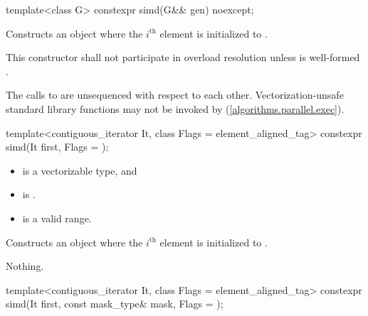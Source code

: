 \begin{itemdecl}
template<class G> constexpr simd(G&& gen) noexcept;
\end{itemdecl}

\begin{itemdescr}
  \pnum\effects
  Constructs an object where the $i^\text{th}$ element is initialized to .

  \pnum\remarks
  This constructor shall not participate in overload resolution unless  is well-formed \foralli.

  \pnum
  The calls to  are unsequenced with respect to each other. Vectorization-unsafe standard library functions may not be invoked by  (\ref{algorithms.parallel.exec}).
\end{itemdescr}

\begin{itemdecl}
template<contiguous_iterator It, class Flags = element_aligned_tag>
  constexpr simd(It first, Flags = {});
\end{itemdecl}

\begin{itemdescr}
  \pnum\constraints
  \begin{itemize}
    \item {} is a vectorizable type, and
    \item {} is .
  \end{itemize}

  \pnum\expects
  \begin{itemize}
    \item \tcode{[first, first + size())} is a valid range.
  \end{itemize}

  \pnum\effects
  Constructs an object where the $i^\text{th}$ element is initialized to  \foralli.

  \pnum\throws Nothing.
\end{itemdescr}

\begin{itemdecl}
template<contiguous_iterator It, class Flags = element_aligned_tag>
  constexpr simd(It first, const mask_type& mask, Flags = {});
\end{itemdecl}

